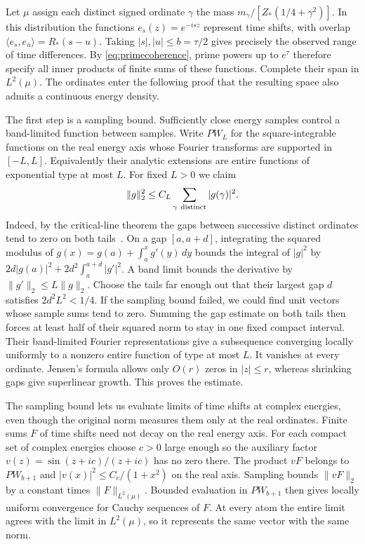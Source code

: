 \documentclass[11pt,letterpaper]{article}
\numberwithin{equation}{section}
\begin{document}
Let $\mu$ assign each distinct signed ordinate $\gamma$ the mass $m_\gamma/[Z_*(1/4+\gamma^2)]$. In this distribution the functions $e_s(z)=e^{-isz}$ represent time shifts, with overlap $\langle e_s,e_u\rangle=R_*(s-u)$. Taking $|s|,|u|\le b=\tau/2$ gives precisely the observed range of time differences. By \eqref{eq:primecoherence}, prime powers up to $e^\tau$ therefore specify all inner products of finite sums of these functions. Complete their span in $L^2(\mu)$. The ordinates enter the following proof that the resulting space also admits a continuous energy density.

The first step is a sampling bound. Sufficiently close energy samples control a band-limited function between samples. Write $PW_L$ for the square-integrable functions on the real energy axis whose Fourier transforms are supported in $[-L,L]$. Equivalently their analytic extensions are entire functions of exponential type at most $L$. For fixed $L>0$ we claim
\[
 \|g\|_2^2\le C_L\sum_{\gamma\ {\rm distinct}}|g(\gamma)|^2 .
\]
Indeed, by the critical-line theorem the gaps between successive distinct ordinates tend to zero on both tails~\cite[Corollary~1]{goldstongap}. On a gap $[a,a+d]$, integrating the squared modulus of $g(x)=g(a)+\int_a^x g'(y)\,dy$ bounds the integral of $|g|^2$ by $2d|g(a)|^2+2d^2\int_a^{a+d}|g'|^2$. A band limit bounds the derivative by $\|g'\|_2\le L\|g\|_2$. Choose the tails far enough out that their largest gap $d$ satisfies $2d^2L^2<1/4$. If the sampling bound failed, we could find unit vectors whose sample sums tend to zero. Summing the gap estimate on both tails then forces at least half of their squared norm to stay in one fixed compact interval. Their band-limited Fourier representations give a subsequence converging locally uniformly to a nonzero entire function of type at most $L$. It vanishes at every ordinate. Jensen's formula allows only $O(r)$ zeros in $|z|\le r$, whereas shrinking gaps give superlinear growth. This proves the estimate.

The sampling bound lets us evaluate limits of time shifts at complex energies, even though the original norm measures them only at the real ordinates. Finite sums $F$ of time shifts need not decay on the real energy axis. For each compact set of complex energies choose $c>0$ large enough so the auxiliary factor $v(z)=\sin(z+ic)/(z+ic)$ has no zero there. The product $vF$ belongs to $PW_{b+1}$ and $|v(x)|^2\le C_c/(1+x^2)$ on the real axis. Sampling bounds $\|vF\|_2$ by a constant times $\|F\|_{L^2(\mu)}$. Bounded evaluation in $PW_{b+1}$ then gives locally uniform convergence for Cauchy sequences of $F$. At every atom the entire limit agrees with the limit in $L^2(\mu)$, so it represents the same vector with the same norm.
\end{document}
